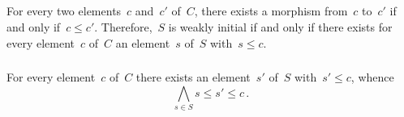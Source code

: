 \subsection{}



\subsubsection{}

For every two elements~$c$ and~$c'$ of~$C$, there exists a morphism from~$c$ to~$c'$ if and only if~$c ≤ c'$.
Therefore,~$S$ is weakly initial if and only if there exists for every element~$c$ of~$C$ an element~$s$ of~$S$ with~$s ≤ c$.



\subsubsection{}

For every element~$c$ of~$C$ there exists an element~$s'$ of~$S$ with~$s' ≤ c$, whence
\[
	⋀_{s ∈ S} s ≤ s' ≤ c \,.
\]
